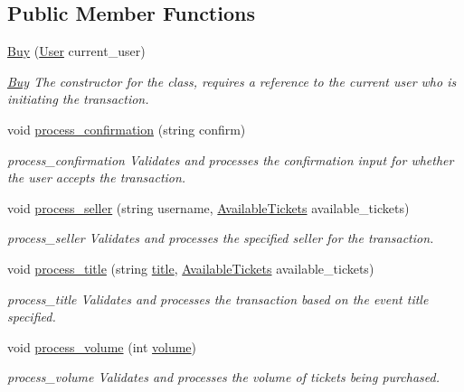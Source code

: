 \subsection*{Public Member Functions}
\begin{DoxyCompactItemize}
\item 
\hyperlink{class_buy_af64c082bb6e6faa31f6176daaaf6ee9c}{Buy} (\hyperlink{class_user}{User} current\-\_\-user)
\begin{DoxyCompactList}\small\item\em \hyperlink{class_buy}{Buy} The constructor for the class, requires a reference to the current user who is initiating the transaction. \end{DoxyCompactList}\item 
void \hyperlink{class_buy_a1a848e03cb750d1df2e393f0a28742aa}{process\-\_\-confirmation} (string confirm)
\begin{DoxyCompactList}\small\item\em process\-\_\-confirmation Validates and processes the confirmation input for whether the user accepts the transaction. \end{DoxyCompactList}\item 
void \hyperlink{class_buy_a618b3b65c7438cec7a8dc10d9176f397}{process\-\_\-seller} (string username, \hyperlink{class_available_tickets}{Available\-Tickets} available\-\_\-tickets)
\begin{DoxyCompactList}\small\item\em process\-\_\-seller Validates and processes the specified seller for the transaction. \end{DoxyCompactList}\item 
void \hyperlink{class_buy_a178c9b58b5d6e9eff49a075583d0e565}{process\-\_\-title} (string \hyperlink{class_buy_a43a5eafe64b96968035e5a4013e47c75}{title}, \hyperlink{class_available_tickets}{Available\-Tickets} available\-\_\-tickets)
\begin{DoxyCompactList}\small\item\em process\-\_\-title Validates and processes the transaction based on the event title specified. \end{DoxyCompactList}\item 
void \hyperlink{class_buy_a5ecf23192210c3fa67fd51720a6f8ab6}{process\-\_\-volume} (int \hyperlink{class_buy_aed48ca0bcd2162fd4fd495873e2631f5}{volume})
\begin{DoxyCompactList}\small\item\em process\-\_\-volume Validates and processes the volume of tickets being purchased. \end{DoxyCompactList}\end{DoxyCompactItemize}
